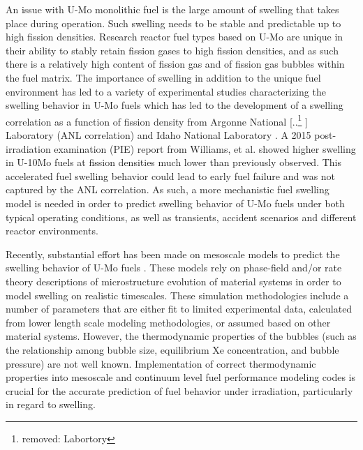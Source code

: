 \documentclass[review]{elsarticle}
\providecommand{\DIFaddtex}[1]{{\protect\color{blue} \sf #1}} %
\providecommand{\DIFdeltex}[1]{{\protect\color{red} [..\footnote{removed: #1} ]}} %
\providecommand{\DIFaddbegin}{} %
\providecommand{\DIFaddend}{} %
\providecommand{\DIFdelbegin}{} %
\providecommand{\DIFdelend}{} %
\providecommand{\DIFadd}[1]{\texorpdfstring{\DIFaddtex{#1}}{#1}} %
\providecommand{\DIFdel}[1]{\texorpdfstring{\DIFdeltex{#1}}{}} %
\newcommand{\DIFscaledelfig}{0.5}
\newlength{\DIFdelgraphicswidth} %
\newlength{\DIFdelgraphicsheight} %
\newcommand{\DIFaddincludegraphics}[2][]{{\color{blue}\fbox{\DIFOincludegraphics[#1]{#2}}}} %
\newcommand{\DIFdelincludegraphics}[2][]{%
\sbox{\DIFdelgraphicsbox}{\DIFOincludegraphics[#1]{#2}}%
\settoboxwidth{\DIFdelgraphicswidth}{\DIFdelgraphicsbox} %
\settoboxtotalheight{\DIFdelgraphicsheight}{\DIFdelgraphicsbox} %
\scalebox{\DIFscaledelfig}{%
\parbox[b]{\DIFdelgraphicswidth}{\usebox{\DIFdelgraphicsbox}\\[-\baselineskip] \rule{\DIFdelgraphicswidth}{0em}}\llap{\resizebox{\DIFdelgraphicswidth}{\DIFdelgraphicsheight}{%
\setlength{\unitlength}{\DIFdelgraphicswidth}%
\begin{picture}(1,1)%
\thicklines\linethickness{2pt} %
{\color[rgb]{1,0,0}\put(0,0){\framebox(1,1){}}}%
{\color[rgb]{1,0,0}\put(0,0){\line( 1,1){1}}}%
{\color[rgb]{1,0,0}\put(0,1){\line(1,-1){1}}}%
\end{picture}%
}\hspace*{3pt}}} %
} %
\DeclareRobustCommand{\DIFaddbegin}{\DIFOaddbegin \let\includegraphics\DIFaddincludegraphics} %
\DeclareRobustCommand{\DIFaddend}{\DIFOaddend \let\includegraphics\DIFOincludegraphics} %
\DeclareRobustCommand{\DIFdelbegin}{\DIFOdelbegin \let\includegraphics\DIFdelincludegraphics} %
\DeclareRobustCommand{\DIFdelend}{\DIFOaddend \let\includegraphics\DIFOincludegraphics} %
\begin{document}
An issue with U-Mo monolithic fuel is the large amount of swelling that takes place during operation\cite{hofman1997}. Such swelling needs to be stable and predictable up to high fission densities. Research reactor fuel types based on U-Mo are unique in their ability to stably retain fission gases to high fission densities, and as such there is a relatively high content of fission gas and of fission gas bubbles within the fuel matrix. The importance of swelling in addition to the unique fuel environment has led to a variety of experimental studies characterizing the swelling behavior in U-Mo fuels \cite{rest2009, kim_anl08, meyer2002, kim2013} which has led to the development of a swelling correlation as a function of fission density from Argonne National \DIFdelbegin \DIFdel{Labortory }\DIFdelend \DIFaddbegin \DIFadd{Laboratory }\DIFaddend (ANL correlation) \cite{kim2011} and Idaho National Laboratory \cite{umo_prelim_report2017}. A 2015 post-irradiation examination (PIE) report \cite{afip6report} from Williams, et al. showed higher swelling in U-10Mo fuels at fission densities much lower than previously observed. This accelerated fuel swelling behavior could lead to early fuel failure and was not captured by the ANL correlation. As such, a more mechanistic fuel swelling model is needed in order to predict swelling behavior of U-Mo fuels under both typical operating conditions, as well as transients, accident scenarios and different reactor environments.

Recently, substantial effort has been made on mesoscale models to predict the swelling behavior of U-Mo fuels \cite{liang2018, liang2018a, liang2017, liang2016, ye2018, hu2017a, hu2016, hu2016a}. These models rely on phase-field and/or rate theory descriptions of microstructure evolution of material systems in order to model swelling on realistic timescales. These simulation methodologies include a number of parameters that are either fit to limited experimental data, calculated from lower length scale modeling methodologies, or assumed based on other material systems. However, the thermodynamic properties of the bubbles (such as the relationship among bubble size, equilibrium Xe concentration, and bubble pressure) are not well known. Implementation of correct thermodynamic properties into mesoscale and continuum level fuel performance modeling codes is crucial for the accurate prediction of fuel behavior under irradiation, particularly in regard to swelling. 
\end{document}
